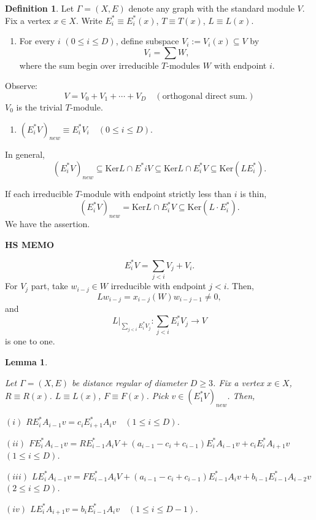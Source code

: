 \documentclass[
]{book}
\providecommand{\tightlist}{%
  \setlength{\itemsep}{0pt}\setlength{\parskip}{0pt}}
\newtheorem{lemma}{Lemma}[chapter]
\theoremstyle{definition}
\newtheorem{definition}{Definition}[chapter]
\theoremstyle{definition}
\theoremstyle{definition}
\theoremstyle{definition}
\theoremstyle{remark}
\begin{document}
\begin{definition}
\protect\hypertarget{def:vix}{}\label{def:vix}Let \(\Gamma = (X, E)\) denote any graph with the standard module \(V\). Fix a vertex \(x\in X\). Write \(E^*_i \equiv E^*_i(x)\), \(T \equiv T(x)\), \(L\equiv L(x)\).

\begin{enumerate}
\def\labelenumi{\arabic{enumi}.}
\tightlist
\item
  For every \(i\) \((0\leq i\leq D)\), define subspace \(V_i := V_i(x) \subseteq V\) by
  \[V_i = \sum W,\]
  where the sum begin over irreducible \(T\)-modules \(W\) with endpoint \(i\).
\end{enumerate}

Observe:
\[V = V_0 + V_1 + \cdots + V_D \quad (\text{orthogonal direct sum.})\]
\(V_0\) is the trivial \(T\)-module.

\begin{enumerate}
\def\labelenumi{\arabic{enumi}.}
\setcounter{enumi}{1}
\tightlist
\item
  \((E^*_iV)_{new} \equiv E^*_iV_i \quad (0\leq i\leq D).\)
\end{enumerate}

In general,
\[(E^*_iV)_{new} \subseteq \mathrm{Ker}L \cap E^*iV \subseteq \mathrm{Ker}L \cap E^*_iV \subseteq \mathrm{Ker}(LE^*_i).\]

If each irreducible \(T\)-module with endpoint strictly less than \(i\) is thin,
\[(E^*_iV)_{new} = \mathrm{Ker}L \cap E^*_iV \subseteq \mathrm{Ker}(L\cdot E^*_i).\]
We have the assertion.
\end{definition}

\textbf{HS MEMO}

\[E^*_iV = \sum_{j<i} V_j + V_i.\]
For \(V_j\) part, take \(w_{i-j}\in W\) irreducible with endpoint \(j<i\). Then,
\[Lw_{i-j} = x_{i-j}(W)w_{i-j-1}\neq 0,\]
and
\[L|_{\sum_{j<i}E^*_iV_j}: \sum_{j<i}E^*_iV_j \to V\]
is one to one.

\begin{lemma}
\protect\hypertarget{lem:action-on-estar1v-new}{}\label{lem:action-on-estar1v-new}

Let \(\Gamma = (X, E)\) be distance regular of diameter \(D\geq 3\). Fix a vertex \(x\in X\), \(R\equiv R(x)\). \(L\equiv L(x)\), \(F \equiv F(x)\). Pick \(v\in (E^*_1V)_{new}\). Then,

\((i)\) \(RE^*_iA_{i-1}v = c_iE^*_{i+1}A_iv\quad (1\leq i\leq D)\).

\((ii)\) \(FE^*_iA_{i-1}v = RE^*_{i-1}A_iV + (a_{i-1}-c_i+c_{i-1})E^*_iA_{i-1}v + c_{i}E^*_{i}A_{i+1}v\) \((1\leq i\leq D)\).

\((iii)\) \(LE^*_iA_{i-1}v = FE^*_{i-1}A_iV + (a_{i-1}-c_i+c_{i-1})E^*_{i-1}A_{i}v + b_{i-1}E^*_{i-1}A_{i-2}v\) \((2\leq i\leq D)\).

\((iv)\) \(LE^*_iA_{i+1}v = b_iE^*_{i-1}A_iv \quad (1\leq i\leq D-1)\).

\end{lemma}
\end{document}
